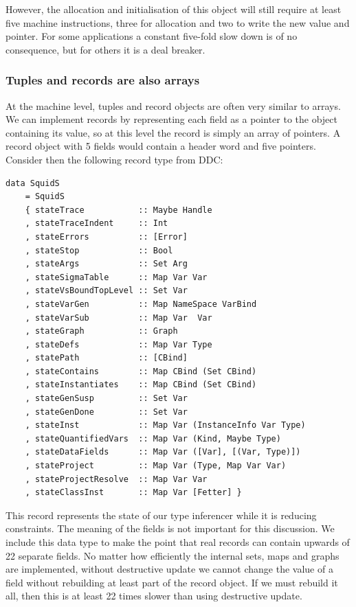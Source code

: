 \vspace{-1em}
However, the allocation and initialisation of this object will still require at least five machine instructions, three for allocation and two to write the new value and pointer. For some applications a constant five-fold slow down is of no consequence, but for others it is a deal breaker. 


\clearpage{}
\subsubsection{Tuples and records are also arrays}

At the machine level, tuples and record objects are often very similar to arrays. We can implement records by representing each field as a pointer to the object containing its value, so at this level the record is simply an array of pointers. A record object with 5 fields would contain a header word and five pointers. Consider then the following record type from DDC:

\begin{lstlisting}
data SquidS 
    = SquidS
    { stateTrace           :: Maybe Handle			
    , stateTraceIndent     :: Int
    , stateErrors          :: [Error]
    , stateStop            :: Bool 
    , stateArgs            :: Set Arg	
    , stateSigmaTable      :: Map Var Var
    , stateVsBoundTopLevel :: Set Var
    , stateVarGen          :: Map NameSpace VarBind 
    , stateVarSub          :: Map Var  Var 
    , stateGraph           :: Graph
    , stateDefs            :: Map Var Type
    , statePath            :: [CBind]
    , stateContains        :: Map CBind (Set CBind)
    , stateInstantiates	   :: Map CBind (Set CBind)
    , stateGenSusp         :: Set Var
    , stateGenDone         :: Set Var
    , stateInst            :: Map Var (InstanceInfo Var Type)			
    , stateQuantifiedVars  :: Map Var (Kind, Maybe Type)
    , stateDataFields      :: Map Var ([Var], [(Var, Type)]) 
    , stateProject         :: Map Var (Type, Map Var Var)	
    , stateProjectResolve  :: Map Var Var
    , stateClassInst       :: Map Var [Fetter] }
\end{lstlisting}

This record represents the state of our type inferencer while it is reducing constraints. The meaning of the fields is not important for this discussion. We include this data type to make the point that real records can contain upwards of 22 separate fields. No matter how efficiently the internal sets, maps and graphs are implemented, without destructive update we cannot change the value of a field without rebuilding at least part of the record object. If we must rebuild it all, then this is at least 22 times slower than using destructive update.

